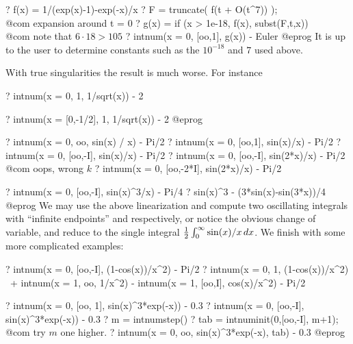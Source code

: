 \bprog
? f(x) = 1/(exp(x)-1)-exp(-x)/x
? F = truncate( f(t + O(t^7)) ); \\@com expansion around t = 0
? g(x) = if (x > 1e-18, f(x), subst(F,t,x))  \\@com note that $6 \cdot 18 > 105$
? intnum(x = 0, [oo,1],  g(x)) - Euler
@eprog\noindent
It is up to the user to determine constants such as the $10^{-18}$ and $7$
used above.

 With true singularities the result is much
worse. For instance

\bprog
? intnum(x = 0, 1,  1/sqrt(x)) - 2

? intnum(x = [0,-1/2], 1,  1/sqrt(x)) - 2
@eprog


\bprog
? intnum(x = 0, oo, sin(x) / x) - Pi/2
? intnum(x = 0, [oo,1], sin(x)/x) - Pi/2
? intnum(x = 0, [oo,-I], sin(x)/x) - Pi/2
? intnum(x = 0, [oo,-I], sin(2*x)/x) - Pi/2  \\@com oops, wrong $k$
? intnum(x = 0, [oo,-2*I], sin(2*x)/x) - Pi/2

? intnum(x = 0, [oo,-I], sin(x)^3/x) - Pi/4
? sin(x)^3 - (3*sin(x)-sin(3*x))/4
@eprog\noindent
We may use the above linearization and compute two oscillating integrals with
``infinite endpoints'' \kbd{[oo, -I]} and \kbd{[oo, -3*I]} respectively, or
notice the obvious change of variable, and reduce to the single integral
${1\over 2}\int_0^\infty \sin(x)/x\,dx$. We finish with some more complicated
examples:

\bprog
? intnum(x = 0, [oo,-I], (1-cos(x))/x^2) - Pi/2
? intnum(x = 0, 1, (1-cos(x))/x^2) \
+ intnum(x = 1, oo, 1/x^2) - intnum(x = 1, [oo,I], cos(x)/x^2) - Pi/2

? intnum(x = 0, [oo, 1], sin(x)^3*exp(-x)) - 0.3
? intnum(x = 0, [oo,-I], sin(x)^3*exp(-x)) - 0.3
? m = intnumstep()
? tab = intnuminit(0,[oo,-I], m+1); \\@com try $m$ one higher.
? intnum(x = 0, oo, sin(x)^3*exp(-x), tab) - 0.3
@eprog

